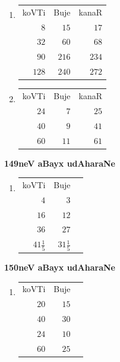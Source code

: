 
\begin{multicols}{2}
\begin{enumerate}[$(1)$]
\item 
\begin{tabular}[t]{rrr}
     koVTi & Buje & kanaR\\
     $8$ & $15$ & $17$\\
     $32$ & $60$ & $68$\\
     $90$ & $216$ & $234$\\
     $128$ & $240$ & $272$
\end{tabular}
\item 
\begin{tabular}[t]{rrr}
     koVTi & Buje & kanaR\\
     $24$ & $7$ & $25$\\
     $40$ & $9$ & $41$\\
     $60$ & $11$ & $61$
\end{tabular}
\end{enumerate}
\end{multicols}

\begin{minipage}{7cm}
\textbf{\large 149neV aBayx udAharaNe}
\begin{enumerate}[$(1)$]
\item 
\begin{tabular}[t]{rrr}
     koVTi & Buje \\
     $4$ & $3$ \\
     $16$ & $12$\\
     $36$ & $27$\\
     $41\frac{1}{5}$ & $31\frac{1}{5}$
\end{tabular}
\end{enumerate}
\end{minipage}
\begin{minipage}{7cm}
\textbf{\large 150neV aBayx udAharaNe}
\begin{enumerate}[$(1)$]
\item 
\begin{tabular}[t]{rrr}
     koVTi & Buje \\
     $20$ & $15$ \\
     $40$ & $30$\\
     $24$ & $10$\\
     $60$ & $25$
\end{tabular}
\end{enumerate}
\end{minipage}
\medskip

